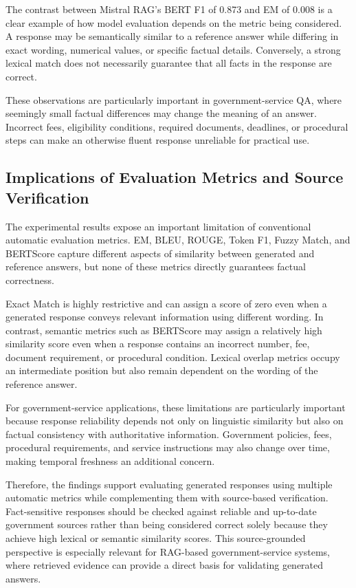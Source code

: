 \documentclass[10pt,journal,compsoc]{IEEEtran}
\begin{document}
The contrast between Mistral RAG's BERT F1 of 0.873 and EM of 0.008 is a
clear example of how model evaluation depends on the metric being considered.
A response may be semantically similar to a reference answer while differing
in exact wording, numerical values, or specific factual details. Conversely,
a strong lexical match does not necessarily guarantee that all facts in the
response are correct.

These observations are particularly important in government-service QA,
where seemingly small factual differences may change the meaning of an
answer. Incorrect fees, eligibility conditions, required documents, deadlines,
or procedural steps can make an otherwise fluent response unreliable for
practical use.

\subsection{Implications of Evaluation Metrics and Source Verification}

The experimental results expose an important limitation of conventional
automatic evaluation metrics. EM, BLEU, ROUGE, Token F1, Fuzzy Match, and
BERTScore capture different aspects of similarity between generated and
reference answers, but none of these metrics directly guarantees factual
correctness.

Exact Match is highly restrictive and can assign a score of zero even when
a generated response conveys relevant information using different wording.
In contrast, semantic metrics such as BERTScore may assign a relatively high
similarity score even when a response contains an incorrect number, fee,
document requirement, or procedural condition. Lexical overlap metrics
occupy an intermediate position but also remain dependent on the wording of
the reference answer.

For government-service applications, these limitations are particularly
important because response reliability depends not only on linguistic
similarity but also on factual consistency with authoritative information.
Government policies, fees, procedural requirements, and service instructions
may also change over time, making temporal freshness an additional concern.

Therefore, the findings support evaluating generated responses using multiple
automatic metrics while complementing them with source-based verification.
Fact-sensitive responses should be checked against reliable and up-to-date
government sources rather than being considered correct solely because they
achieve high lexical or semantic similarity scores. This source-grounded
perspective is especially relevant for RAG-based government-service systems,
where retrieved evidence can provide a direct basis for validating generated
answers.
\end{document}

